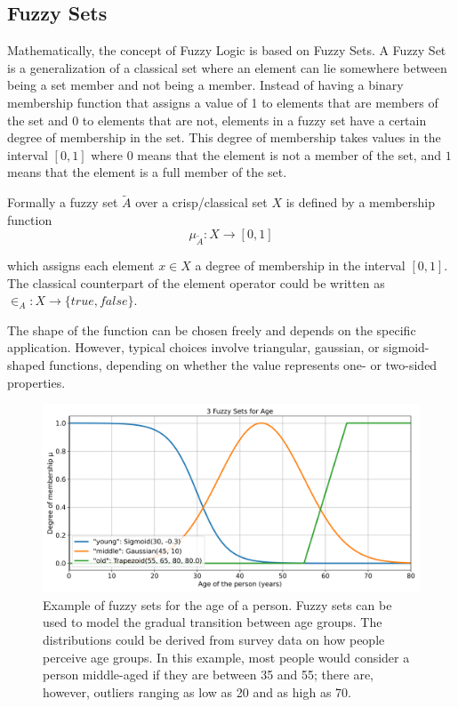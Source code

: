 \subsection{Fuzzy Sets}

Mathematically, the concept of Fuzzy Logic is based on Fuzzy Sets. A Fuzzy Set is a generalization of a classical set where an element can lie somewhere between being a set member and not being a member. Instead of having a binary membership function that assigns a value of 1 to elements that are members of the set and 0 to elements that are not, elements in a fuzzy set have a certain degree of membership in the set. This degree of membership takes values in the interval $[0, 1]$ where $0$ means that the element is not a member of the set, and $1$ means that the element is a full member of the set.

Formally a fuzzy set $\tilde{A}$ over a crisp/classical set $X$ is defined by a membership function
\begin{equation}
      \mu_{\tilde{A}}: X \rightarrow [0, 1]
\end{equation}

which assigns each element $x \in X$ a degree of membership in the interval $[0, 1]$. The classical counterpart of the element operator could be written as $\in_A: X \rightarrow \{true, false\}$.

The shape of the function can be chosen freely and depends on the specific application. However, typical choices involve triangular, gaussian, or sigmoid-shaped functions, depending on whether the value represents one- or two-sided properties.


\begin{figure}[H]
      \centering
      \includegraphics[width=0.8\columnwidth,trim={0 0 0 1cm},clip]{figures/Intro/age-fuzzy-sets.png}
      \caption{Example of fuzzy sets for the age of a person. Fuzzy sets can be used to model the gradual transition between age groups. The distributions could be derived from survey data on how people perceive age groups. In this example, most people would consider a person middle-aged if they are between 35 and 55; there are, however, outliers ranging as low as 20 and as high as 70.}
      \label{fig:fuzzy_sets}
\end{figure}

